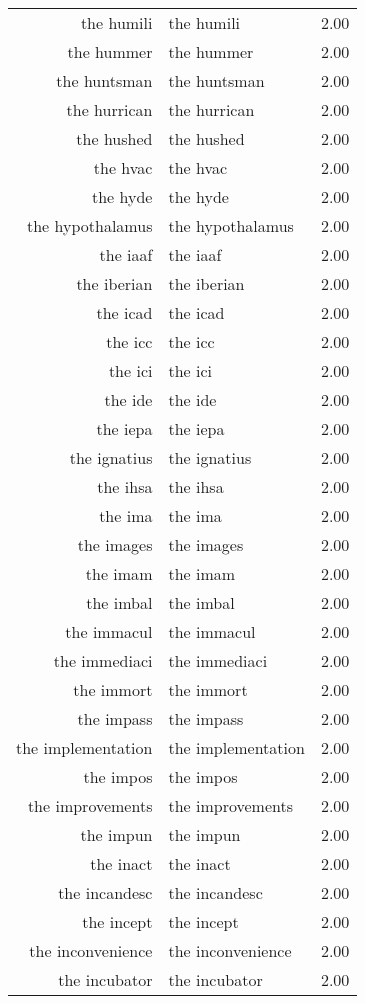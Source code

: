 \begin{table}[ht]
\begin{tabular}{rlr}
  the humili & the humili & 2.00 \\ 
  the hummer & the hummer & 2.00 \\ 
  the huntsman & the huntsman & 2.00 \\ 
  the hurrican & the hurrican & 2.00 \\ 
  the hushed & the hushed & 2.00 \\ 
  the hvac & the hvac & 2.00 \\ 
  the hyde & the hyde & 2.00 \\ 
  the hypothalamus & the hypothalamus & 2.00 \\ 
  the iaaf & the iaaf & 2.00 \\ 
  the iberian & the iberian & 2.00 \\ 
  the icad & the icad & 2.00 \\ 
  the icc & the icc & 2.00 \\ 
  the ici & the ici & 2.00 \\ 
  the ide & the ide & 2.00 \\ 
  the iepa & the iepa & 2.00 \\ 
  the ignatius & the ignatius & 2.00 \\ 
  the ihsa & the ihsa & 2.00 \\ 
  the ima & the ima & 2.00 \\ 
  the images & the images & 2.00 \\ 
  the imam & the imam & 2.00 \\ 
  the imbal & the imbal & 2.00 \\ 
  the immacul & the immacul & 2.00 \\ 
  the immediaci & the immediaci & 2.00 \\ 
  the immort & the immort & 2.00 \\ 
  the impass & the impass & 2.00 \\ 
  the implementation & the implementation & 2.00 \\ 
  the impos & the impos & 2.00 \\ 
  the improvements & the improvements & 2.00 \\ 
  the impun & the impun & 2.00 \\ 
  the inact & the inact & 2.00 \\ 
  the incandesc & the incandesc & 2.00 \\ 
  the incept & the incept & 2.00 \\ 
  the inconvenience & the inconvenience & 2.00 \\ 
  the incubator & the incubator & 2.00 \\ 

\end{tabular}
\end{table}
